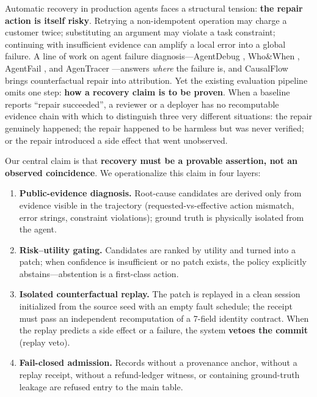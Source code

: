 \documentclass[10pt]{article}
\begin{document}
Automatic recovery in production agents faces a structural tension: \textbf{the repair action is itself risky}. Retrying a non-idempotent operation may charge a customer twice; substituting an argument may violate a task constraint; continuing with insufficient evidence can amplify a local error into a global failure. A line of work on agent failure diagnosis---AgentDebug \cite{ref1}, Who\&When \cite{ref2}, AgentFail \cite{ref3}, and AgenTracer \cite{ref4}---answers \emph{where} the failure is, and CausalFlow \cite{ref5} brings counterfactual repair into attribution. Yet the existing evaluation pipeline omits one step: \textbf{how a recovery claim is to be proven}. When a baseline reports ``repair succeeded'', a reviewer or a deployer has no recomputable evidence chain with which to distinguish three very different situations: the repair genuinely happened; the repair happened to be harmless but was never verified; or the repair introduced a side effect that went unobserved.

Our central claim is that \textbf{recovery must be a provable assertion, not an observed coincidence}. We operationalize this claim in four layers:

\begin{enumerate}

  \item \textbf{Public-evidence diagnosis.} Root-cause candidates are derived only from evidence visible in the trajectory (requested-vs-effective action mismatch, error strings, constraint violations); ground truth is physically isolated from the agent.

  \item \textbf{Risk--utility gating.} Candidates are ranked by utility and turned into a patch; when confidence is insufficient or no patch exists, the policy explicitly abstains---abstention is a first-class action.

  \item \textbf{Isolated counterfactual replay.} The patch is replayed in a clean session initialized from the source seed with an empty fault schedule; the receipt must pass an independent recomputation of a 7-field identity contract. When the replay predicts a side effect or a failure, the system \textbf{vetoes the commit} (replay veto).

  \item \textbf{Fail-closed admission.} Records without a provenance anchor, without a replay receipt, without a refund-ledger witness, or containing ground-truth leakage are refused entry to the main table.

\end{enumerate}
\end{document}
